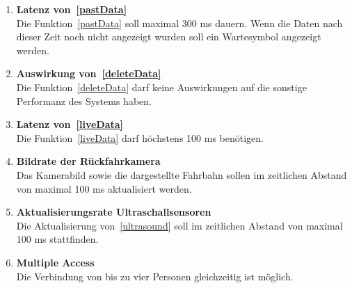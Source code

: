\documentclass[pflichtenheft.tex]{subfiles}
\begin{document}
\begin{enumerate}

	\item{\textbf{Latenz von~\ref{pastData}}} \\
	Die Funktion~\ref{pastData} soll maximal 300 ms dauern. Wenn die Daten nach dieser Zeit noch nicht angezeigt wurden soll ein Wartesymbol angezeigt werden. 

	\item{\textbf{Auswirkung von~\ref{deleteData}}} \\
	Die Funktion~\ref{deleteData} darf keine Auswirkungen auf die sonstige Performanz des Systems haben.

	\item{\textbf{Latenz von~\ref{liveData}}} \\
	Die Funktion~\ref{liveData} darf höchstens 100 ms benötigen.

	\item{\textbf{Bildrate der Rückfahrkamera}} \\
	Das Kamerabild sowie die dargestellte Fahrbahn sollen im zeitlichen Abstand von maximal 100 ms aktualisiert werden.

	\item{\textbf{Aktualisierungsrate Ultraschallsensoren}} \\
	Die Aktualisierung von~\ref{ultrasound} soll im zeitlichen Abstand von maximal 100 ms stattfinden.

	\item{\textbf{Multiple Access}} \\
	Die Verbindung von bis zu vier Personen gleichzeitig ist möglich.


\end{enumerate}
\end{document}

